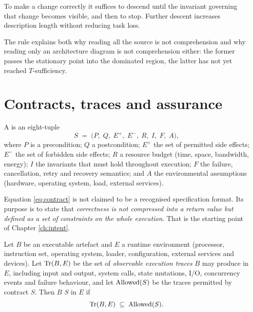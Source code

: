 \begin{principle}\label{pr:descent}
To make a change correctly it suffices to descend until the invariant governing that change
becomes visible, and then to stop. Further descent increases description length without
reducing task loss.
\end{principle}

The rule explains both why reading all the source is not comprehension and why reading only
an architecture diagram is not comprehension either: the former passes the stationary point
into the dominated region, the latter has not yet reached $T$-sufficiency.

\section{Contracts, traces and assurance}\label{sec:contract}

\begin{definition}\label{def:contract}
A  is an eight-tuple
\begin{equation}\label{eq:contract}
S \;=\; \bigl(P,\; Q,\; E^{+},\; E^{-},\; R,\; I,\; F,\; A\bigr),
\end{equation}
where $P$ is a precondition; $Q$ a postcondition; $E^{+}$ the set of permitted side
effects; $E^{-}$ the set of forbidden side effects; $R$ a resource budget (time, space,
bandwidth, energy); $I$ the invariants that must hold throughout execution; $F$ the
failure, cancellation, retry and recovery semantics; and $A$ the environmental assumptions
(hardware, operating system, load, external services).
\end{definition}

Equation \eqref{eq:contract} is not claimed to be a recognised specification format. Its
purpose is to state that \emph{correctness is not compressed into a return value but
defined as a set of constraints on the whole execution}. That is the starting point of
Chapter \ref{ch:intent}.

\begin{definition}\label{def:traces}
Let $B$ be an executable artefact and $E$ a runtime environment (processor, instruction
set, operating system, loader, configuration, external services and devices). Let
$\operatorname{Tr}(B,E)$ be the set of \emph{observable execution traces} $B$ may produce in $E$,
including input and output, system calls, state mutations, I/O, concurrency events and
failure behaviour, and let $\operatorname{Allowed}(S)$ be the traces permitted by contract $S$. Then $B$
 $S$ in $E$ if
\begin{equation}\label{eq:inclusion}
\operatorname{Tr}(B,E) \;\subseteq\; \operatorname{Allowed}(S).
\end{equation}
\end{definition}

